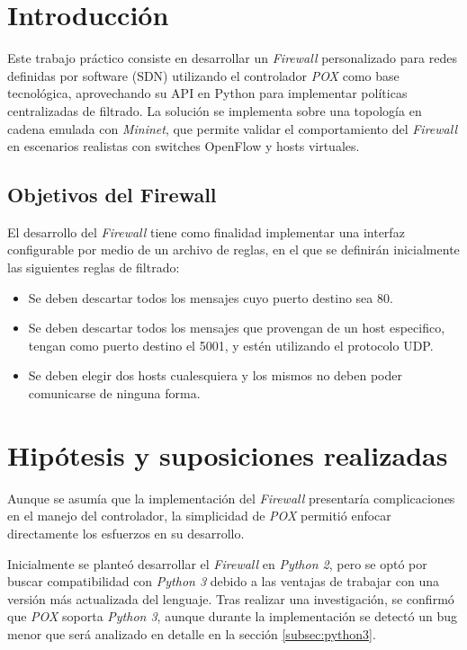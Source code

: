 \section{Introducción}

Este trabajo práctico consiste en desarrollar un \textit{Firewall} personalizado para redes definidas por software (SDN) utilizando el controlador \textit{POX} como base tecnológica, aprovechando su API en Python para implementar políticas centralizadas de filtrado. La solución se implementa sobre una topología en cadena emulada con \textit{Mininet}, que permite validar el comportamiento del \textit{Firewall} en escenarios realistas con switches OpenFlow y hosts virtuales. 

\vspace{0.25 cm}

\subsection{Objetivos del Firewall}
El desarrollo del \textit{Firewall} tiene como finalidad implementar una interfaz configurable por medio de un archivo de reglas, en el que se definirán inicialmente las siguientes reglas de filtrado:

\begin{itemize}
    \item[1.] Se deben descartar todos los mensajes cuyo puerto destino sea 80.
    
    \item[2.] Se deben descartar todos los mensajes que provengan de un host especifico, tengan como puerto destino el 5001, y estén utilizando el protocolo UDP.
    
    \item[3.] Se deben elegir dos hosts cualesquiera y los mismos no deben poder comunicarse de ninguna forma.
\end{itemize}


\section{Hipótesis y suposiciones realizadas}

Aunque se asumía que la implementación del \textit{Firewall} presentaría complicaciones en el manejo del controlador, la simplicidad de \textit{POX} permitió enfocar directamente los esfuerzos en su desarrollo.

\vspace{0.25cm}

Inicialmente se planteó desarrollar el \textit{Firewall} en \textit{Python 2}, pero se optó por buscar compatibilidad con \textit{Python 3} debido a las ventajas de trabajar con una versión más actualizada del lenguaje. Tras realizar una investigación, se confirmó que \textit{POX} soporta \textit{Python 3}, aunque durante la implementación se detectó un bug menor que será analizado en detalle en la sección \ref{subsec:python3}.

